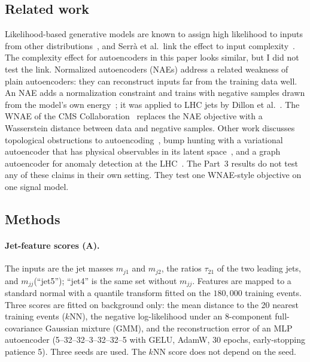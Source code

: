 \documentclass[11pt,a4paper]{article}
\newcommand{\mjj}{\ensuremath{m_{jj}}\xspace}
\begin{document}
\subsection{Related work}
\label{sec:related}

Likelihood-based generative models are known to assign high likelihood to inputs from other
distributions~\cite{Nalisnick:2018dgm}, and Serr\`a et al.\ link the effect to input complexity~\cite{Serra:2019ocd}.
The complexity effect for autoencoders in this paper looks similar, but I did not test the link.
Normalized autoencoders (NAEs) address a related weakness of plain autoencoders: they can
reconstruct inputs far from the training data well. An NAE adds a normalization constraint and
trains with negative samples drawn from the model's own energy~\cite{Yoon:2021nae}; it was
applied to LHC jets by Dillon et al.~\cite{Dillon:2022mkq}. The WNAE of the CMS
Collaboration~\cite{CMS:2025lmn} replaces the NAE objective with a Wasserstein distance between
data and negative samples. Other work discusses topological obstructions to autoencoding~\cite{Batson:2021agz},
bump hunting with a variational autoencoder that has physical observables in its latent space~\cite{Bortolato:2021zic}, and a graph autoencoder
for anomaly detection at the LHC~\cite{Araz:2025oax}. The Part~3 results do not test any of these claims in their own
setting. They test one WNAE-style objective on one signal model.

\subsection{Methods}
\label{sec:part3methods}

\paragraph{Jet-feature scores (A).}
The inputs are the jet masses $m_{j1}$ and $m_{j2}$, the ratios $\tau_{21}$ of the two leading
jets, and \mjj (``jet5''); ``jet4'' is the same set without \mjj. Features are mapped to a
standard normal with a quantile transform fitted on the $180{,}000$ training events. Three scores are
fitted on background only: the mean distance to the 20 nearest training events ($k$NN), the negative
log-likelihood under an 8-component full-covariance Gaussian mixture (GMM), and the reconstruction error
of an MLP autoencoder (5--32--32--3--32--32--5 with GELU, AdamW, 30 epochs, early-stopping
patience 5). Three seeds are used. The $k$NN score does not depend on the seed.
\end{document}
